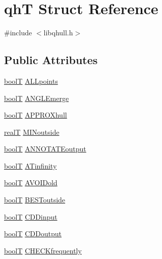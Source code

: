 \hypertarget{structqhT}{}\section{qh\+T Struct Reference}
\label{structqhT}


{\ttfamily \#include $<$libqhull.\+h$>$}

\subsection*{Public Attributes}
\begin{DoxyCompactItemize}
\item 
\hyperlink{libqhull_8h_ab1a924b550e00cabe8c367e76b207ea5}{bool\+T} \hyperlink{structqhT_a37ef35ac67fee9c4a5b57043e13ceda6}{A\+L\+Lpoints}
\item 
\hyperlink{libqhull_8h_ab1a924b550e00cabe8c367e76b207ea5}{bool\+T} \hyperlink{structqhT_a63264c49b504b7cd69707940854596f4}{A\+N\+G\+L\+Emerge}
\item 
\hyperlink{libqhull_8h_ab1a924b550e00cabe8c367e76b207ea5}{bool\+T} \hyperlink{structqhT_a0f172253244549d1daf57e6438cf00a8}{A\+P\+P\+R\+O\+Xhull}
\item 
\hyperlink{user_8h_ad6fe71dff955732ea8682263e9540bb7}{real\+T} \hyperlink{structqhT_a0f1c6c273f4bc11bd9f26c0923edc761}{M\+I\+Noutside}
\item 
\hyperlink{libqhull_8h_ab1a924b550e00cabe8c367e76b207ea5}{bool\+T} \hyperlink{structqhT_a7fe38b67541c11de687675ca1d77836a}{A\+N\+N\+O\+T\+A\+T\+Eoutput}
\item 
\hyperlink{libqhull_8h_ab1a924b550e00cabe8c367e76b207ea5}{bool\+T} \hyperlink{structqhT_a467244d77c3932b37b629c624403b6c0}{A\+Tinfinity}
\item 
\hyperlink{libqhull_8h_ab1a924b550e00cabe8c367e76b207ea5}{bool\+T} \hyperlink{structqhT_a1e7d100e69723e2886202a92e3e41377}{A\+V\+O\+I\+Dold}
\item 
\hyperlink{libqhull_8h_ab1a924b550e00cabe8c367e76b207ea5}{bool\+T} \hyperlink{structqhT_a357c978029a20fc53fa860f8f6503cf4}{B\+E\+S\+Toutside}
\item 
\hyperlink{libqhull_8h_ab1a924b550e00cabe8c367e76b207ea5}{bool\+T} \hyperlink{structqhT_a20ee69606d67ee312b3c9629165d7b65}{C\+D\+Dinput}
\item 
\hyperlink{libqhull_8h_ab1a924b550e00cabe8c367e76b207ea5}{bool\+T} \hyperlink{structqhT_a81a8a6697bfeff5e8661184473c248c9}{C\+D\+Doutput}
\item 
\hyperlink{libqhull_8h_ab1a924b550e00cabe8c367e76b207ea5}{bool\+T} \hyperlink{structqhT_ab9c6add68373bb9338d1a47865eb7f71}{C\+H\+E\+C\+Kfrequently}

\end{DoxyCompactItemize}
